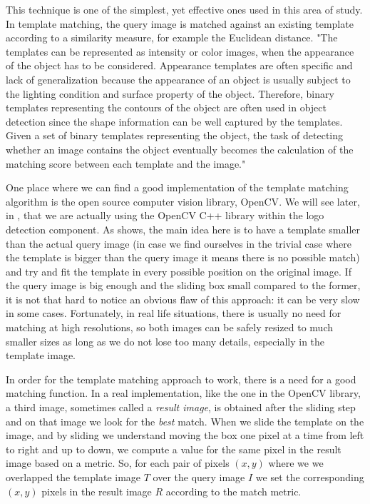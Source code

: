 This technique is one of the simplest, yet effective ones used in this area of
study. In template matching, the query image is matched against an existing
template according to a similarity measure, for example the Euclidean
distance. "The templates can be represented as intensity or color images, when the
appearance of the object has to be considered. Appearance templates are often
specific and lack of generalization because the appearance of an object is
usually subject to the lighting condition and surface property of the object.
Therefore, binary templates representing the contours of the object are often
used in object detection since the shape information can be well captured by
the templates. Given a set of binary templates representing the object, the
task of detecting whether an image contains the object eventually becomes the
calculation of the matching score between each template and the
image."\cite{improved-template}

One place where we can find a good implementation of the template matching
algorithm is the open source computer vision library, OpenCV\cite{open-cv}.
We will see later, in , that we
are actually using the OpenCV C++ library within the logo detection component. As
 shows, the main idea here is to
have a template smaller than the actual query image (in case we find ourselves
in the trivial case where the template is bigger than the query image it means
there is no possible match) and try and fit the template in every possible
position on the original image. If the query image is big enough and the
sliding box small compared to the former, it is not that hard to notice an
obvious flaw of this approach: it can be very slow in some cases. Fortunately,
in real life situations, there is usually no need for matching at high
resolutions, so both images can be safely resized to much smaller sizes as
long as we do not lose too many details, especially in the template image.


In order for the template matching approach to work, there is a need for a
good matching function. In a real implementation, like the one in the OpenCV
library, a third image, sometimes called a \textit{result image}, is obtained
after the sliding step and on that image we look for the \textit{best} match.
When we slide the template on the image, and by sliding we understand moving
the box one pixel at a time from left to right and up to down, we compute a
value for the same pixel in the result image based on a metric. So, for each
pair of pixels \((x, y)\) where we we overlapped the template image \(T\) over
the query image \(I\) we set the corresponding \((x, y)\) pixels in the result
image \(R\) according to the match metric.

